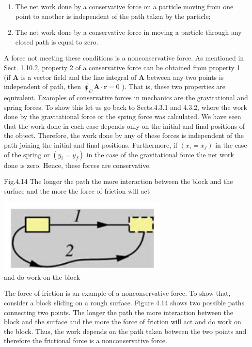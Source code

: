 \documentclass[10pt]{article}
\begin{document}
\begin{enumerate}
  \item The net work done by a conservative force on a particle moving from one point to another is independent of the path taken by the particle;
  \item The net work done by a conservative force in moving a particle through any closed path is equal to zero.
\end{enumerate}

A force not meeting these conditions is a nonconservative force. As mentioned in Sect. 1.10.2, property 2 of a conservative force can be obtained from property 1 (if $\mathbf{A}$ is a vector field and the line integral of $\mathbf{A}$ between any two points is independent of path, then $\oint_{C} \mathbf{A} \cdot \mathbf{r}=0$ ). That is, these two properties are equivalent. Examples of conservative forces in mechanics are the gravitational and spring forces. To show this let us go back to Sects.4.3.1 and 4.3.2, where the work done by the gravitational force or the spring force was calculated. We have seen that the work done in each case depends only on the initial and final positions of the object. Therefore, the work done by any of these forces is independent of the path joining the initial and final positions. Furthermore, if $\left(x_{i}=x_{f}\right)$ in the case of the spring or $\left(y_{i}=y_{f}\right)$ in the case of the gravitational force the net work done is zero. Hence, these forces are conservative.

Fig.4.14 The longer the path the more interaction between the block and the surface and the more the force of friction will act

\includegraphics[max width=\textwidth, center]{2024_09_13_db1f357d2aad0a03eb2eg-069}\\
and do work on the block

The force of friction is an example of a nonconservative force. To show that, consider a block sliding on a rough surface. Figure 4.14 shows two possible paths connecting two points. The longer the path the more interaction between the block and the surface and the more the force of friction will act and do work on the block. Thus, the work depends on the path taken between the two points and therefore the frictional force is a nonconservative force.
\end{document}
